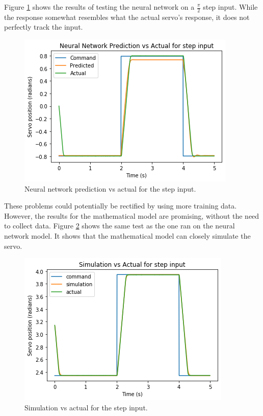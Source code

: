 \documentclass[letterpaper,12pt]{article}
\begin{document}
Figure \ref{fig:model_results_2} shows the results of testing the neural network on a $\frac{\pi}{2}$ step input. While the response somewhat resembles what the actual servo's response, it does not perfectly track the input.

\begin{figure}[H]
\centering \includegraphics[width=0.8\columnwidth]{model_results_2.png}
\caption{\label{fig:model_results_2} Neural network prediction vs actual for the step input.}
\end{figure}

These problems could potentially be rectified by using more training data. However, the results for the mathematical model are promising, without the need to collect data. Figure \ref{fig:simulation_results_1} shows the same test as the one ran on the neural network model. It shows that the mathematical model can closely simulate the servo.

\begin{figure}[H]
\centering \includegraphics[width=0.8\columnwidth]{simulation_results_1.png}
\caption{\label{fig:simulation_results_1}Simulation vs actual for the step input.}
\end{figure}
\end{document}
